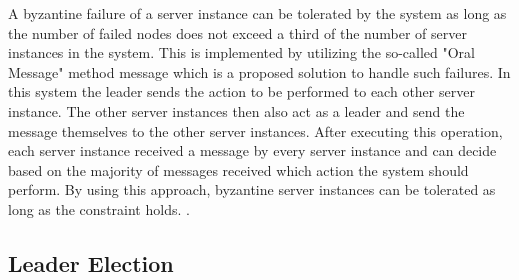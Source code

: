 \documentclass[runningheads]{llncs}
\begin{document}
A byzantine failure of a server instance can be tolerated by the system as
long as the number of failed nodes does not exceed a third of the number of
server instances in the system. This is implemented by utilizing the so-called
"Oral Message" method message which is a proposed solution to handle such
failures. In this system the leader sends the action to be performed to each
other server instance. The other server instances then also act as a leader and
send the message themselves to the other server instances. After executing this
operation, each server instance received a message by every server instance and
can decide based on the majority of messages received which action the system
should perform. By using this approach, byzantine server instances can be
tolerated as long as the constraint holds. \cite{lamport2019byzantine}.

\subsection{Leader Election}
\end{document}
